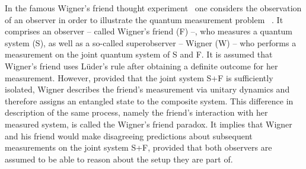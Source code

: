 \documentclass[a4paper,twocolumn,11pt,accepted=2017-05-09,dvipsnames]{quantumarticle}
\numberwithin{equation}{section}
\begin{document}
In the famous Wigner's friend thought experiment~\cite{wigner1963problem} one considers the observation of an observer in order to illustrate the quantum measurement problem~ \cite{maudlin1995three,bub2010two,brukner2017quantum}. It comprises an observer -- called Wigner's friend (F) --, who measures a quantum system (S), as well as a so-called superobserver -- Wigner (W) -- who performs a measurement on the joint quantum system of S and F. It is assumed that Wigner's friend uses Lüder's rule after obtaining a definite outcome for her measurement. However, provided that the joint system S+F is sufficiently isolated, Wigner describes the friend's measurement via unitary dynamics and therefore assigns an entangled state to the composite system. This difference in description of the same process, namely the friend's interaction with her measured system, is called the Wigner's friend paradox. It implies that Wigner and his friend would make disagreeing predictions about subsequent measurements on the joint system S+F, provided that both observers are assumed to be able to reason about the setup they are part of. 
\end{document}
